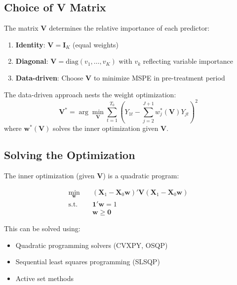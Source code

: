 \subsection{Choice of V Matrix}

The matrix $\mathbf{V}$ determines the relative importance of each predictor:

\begin{definition}
\begin{enumerate}
    \item \textbf{Identity}: $\mathbf{V} = \mathbf{I}_K$ (equal weights)
    \item \textbf{Diagonal}: $\mathbf{V} = \text{diag}(v_1, \ldots, v_K)$ with $v_k$ reflecting variable importance
    \item \textbf{Data-driven}: Choose $\mathbf{V}$ to minimize MSPE in pre-treatment period
\end{enumerate}
\end{definition}

The data-driven approach nests the weight optimization:
\begin{equation}
    \mathbf{V}^* = \arg\min_{\mathbf{V}} \sum_{t=1}^{T_0} \left(Y_{1t} - \sum_{j=2}^{J+1} w_j^*(\mathbf{V}) Y_{jt}\right)^2
\end{equation}
where $\mathbf{w}^*(\mathbf{V})$ solves the inner optimization given $\mathbf{V}$.

\subsection{Solving the Optimization}

The inner optimization (given $\mathbf{V}$) is a quadratic program:

\begin{align}
    \min_{\mathbf{w}} \quad & (\mathbf{X}_1 - \mathbf{X}_0 \mathbf{w})' \mathbf{V} (\mathbf{X}_1 - \mathbf{X}_0 \mathbf{w}) \\
    \text{s.t.} \quad & \mathbf{1}' \mathbf{w} = 1 \\
    & \mathbf{w} \geq \mathbf{0}
\end{align}

This can be solved using:
\begin{itemize}
    \item Quadratic programming solvers (CVXPY, OSQP)
    \item Sequential least squares programming (SLSQP)
    \item Active set methods
\end{itemize}

